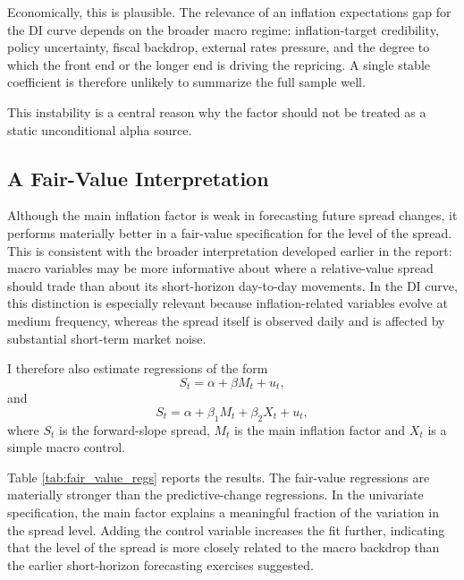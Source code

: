 \documentclass[11pt]{article}
\begin{document}
	Economically, this is plausible. The relevance of an inflation expectations gap for the DI curve depends on the broader macro regime: inflation-target credibility, policy uncertainty, fiscal backdrop, external rates pressure, and the degree to which the front end or the longer end is driving the repricing. A single stable coefficient is therefore unlikely to summarize the full sample well.
	
	This instability is a central reason why the factor should not be treated as a static unconditional alpha source.
	
	\subsection{A Fair-Value Interpretation}
	\label{subsec:fair_value_interpretation}
	
	Although the main inflation factor is weak in forecasting future spread changes, it performs materially better in a fair-value specification for the level of the spread. This is consistent with the broader interpretation developed earlier in the report: macro variables may be more informative about where a relative-value spread should trade than about its short-horizon day-to-day movements. In the DI curve, this distinction is especially relevant because inflation-related variables evolve at medium frequency, whereas the spread itself is observed daily and is affected by substantial short-term market noise.
	
	I therefore also estimate regressions of the form
	\[
	S_t = \alpha + \beta M_t + u_t,
	\]
	and
	\[
	S_t = \alpha + \beta_1 M_t + \beta_2 X_t + u_t,
	\]
	where  \(S_t\) is the forward-slope spread, \(M_t\) is the main inflation factor and \(X_t\) is a simple macro control.
	
	\begin{table}[H]
		\centering
		\footnotesize
		\resizebox{\textwidth}{!}{
			
		}
		\caption{Fair-value regressions for the spread level.}
		\label{tab:fair_value_regs}
	\end{table}
	

	
	Table \ref{tab:fair_value_regs} reports the results. The fair-value regressions are materially stronger than the predictive-change regressions. In the univariate specification, the main factor explains a meaningful fraction of the variation in the spread level. Adding the control variable increases the fit further, indicating that the level of the spread is more closely related to the macro backdrop than the earlier short-horizon forecasting exercises suggested.
	
\end{document}
